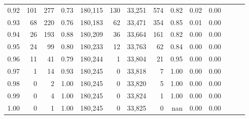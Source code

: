 \begin{tabular}{rrrrrrrrrrrrrr}
0.92 &    101 &  277 &  0.73 &  180,115 &      130 &  33,251 &     574 &  0.82 &  0.02 &      0.00 \\
0.93 &     68 &  220 &  0.76 &  180,183 &       62 &  33,471 &     354 &  0.85 &  0.01 &      0.00 \\
0.94 &     26 &  193 &  0.88 &  180,209 &       36 &  33,664 &     161 &  0.82 &  0.00 &      0.00 \\
0.95 &     24 &   99 &  0.80 &  180,233 &       12 &  33,763 &      62 &  0.84 &  0.00 &      0.00 \\
0.96 &     11 &   41 &  0.79 &  180,244 &        1 &  33,804 &      21 &  0.95 &  0.00 &      0.00 \\
0.97 &      1 &   14 &  0.93 &  180,245 &        0 &  33,818 &       7 &  1.00 &  0.00 &      0.00 \\
0.98 &      0 &    2 &  1.00 &  180,245 &        0 &  33,820 &       5 &  1.00 &  0.00 &      0.00 \\
0.99 &      0 &    4 &  1.00 &  180,245 &        0 &  33,824 &       1 &  1.00 &  0.00 &      0.00 \\
1.00 &      0 &    1 &  1.00 &  180,245 &        0 &  33,825 &       0 &   nan &  0.00 &      0.00 \\
\bottomrule
\end{tabular}
